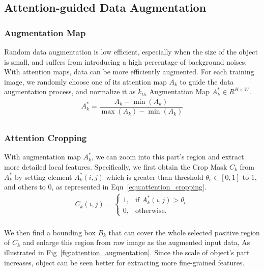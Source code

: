 \documentclass[10pt,twocolumn,letterpaper]{article}
\begin{document}
\subsection{Attention-guided Data Augmentation}
\label{subsec:augmentation}
\subsubsection{Augmentation Map}
Random data augmentation is low efficient, especially when the size of the object is small, and suffers from introducing a high percentage of background noises. With attention maps, data can be more efficiently augmented. For each training image, we randomly choose one of its attention map $A_k$ to guide the data augmentation process, and normalize it as $k_{th}$ Augmentation Map $A^*_k\in R^{H\times W}$.
\begin{equation}
  \begin{array}{l}
    A^*_k = \dfrac{A_k - \min(A_k)}{\max(A_k) - \min(A_k)} \\
  \end{array}
    \label{equ:normalized_map}
\end{equation}

\subsubsection{Attention Cropping}
With augmentation map $A^*_k$, we can zoom into this part's region and extract more detailed local features. Specifically, we first obtain the Crop Mask $C_k$ from $A^*_k$ by setting element $A^*_k(i, j)$ which is greater than threshold $\theta_c\in [0, 1]$ to $1$, and others to $0$, as represented in Equ~\ref{equ:attention_cropping}.
\begin{equation}
  \begin{array}{l}
        C_k(i, j)=\begin{cases}
            1, & \text{if $A^*_k(i, j) > \theta_c $}\\
            0, & \text{otherwise}.
          \end{cases} \\
  \end{array}
    \label{equ:attention_cropping}
\end{equation}

We then find a bounding box $B_k$ that can cover the whole selected positive region of $C_k$ and enlarge this region from raw image as the augmented input data, As illustrated in Fig~\ref{fig:attention_augmentation}. Since the scale of object's part increases, object can be seen better for extracting more fine-grained features.
\end{document}
